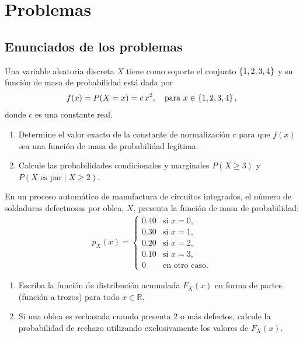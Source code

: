 \section*{Problemas}

\subsection*{Enunciados de los problemas}

\begin{problema}
	\label{prob:2c27c8e}
	Una variable aleatoria discreta $X$ tiene como soporte el conjunto $\left\{ 1, 2, 3, 4 \right\}$ y su función de masa de probabilidad está dada por
	\begin{align*}
		f(x) = P(X = x) = c\, x^2, \quad \text{para } x \in \left\{ 1, 2, 3, 4 \right\},
	\end{align*}
	donde $c$ es una constante real.
	\begin{enumerate}
		\item Determine el valor exacto de la constante de normalización $c$ para que $f(x)$ sea una función de masa de probabilidad legítima.
		\item Calcule las probabilidades condicionales y marginales $P(X \ge 3)$ y $P(X \text{ es par} \mid X \ge 2)$.
	\end{enumerate}
\end{problema}

\begin{problema}
	\label{prob:9efeaae}
	En un proceso automático de manufactura de circuitos integrados, el número de soldaduras defectuosas por oblea, $X$, presenta la función de masa de probabilidad:
	\begin{align*}
		p_X(x) = \begin{cases}
			0.40 & \text{si } x = 0, \\
			0.30 & \text{si } x = 1, \\
			0.20 & \text{si } x = 2, \\
			0.10 & \text{si } x = 3, \\
			0 & \text{en otro caso.}
		\end{cases}
	\end{align*}
	\begin{enumerate}
		\item Escriba la función de distribución acumulada $F_X(x)$ en forma de partes (función a trozos) para todo $x \in \mathbb{R}$.
		\item Si una oblea es rechazada cuando presenta $2$ o más defectos, calcule la probabilidad de rechazo utilizando exclusivamente los valores de $F_X(x)$.
	\end{enumerate}
\end{problema}


